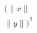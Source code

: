 \documentclass[preview]{standalone}
\begin{document}
\begin{align*}
(\lVert x \rVert \\ \lVert y \rVert)^{2}
\end{align*}
\end{document}
